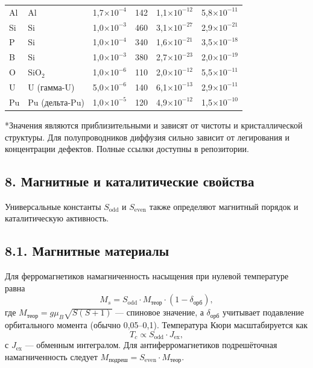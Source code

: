 \documentclass[12pt,a4paper]{article}
\begin{document}
\begin{longtable}{p{1.2cm}p{1.2cm}p{2.0cm}p{2.5cm}p{2.5cm}p{2.5cm}}
		Al & Al & 1,7\(\times10^{-4}\) & 142 & 1,1\(\times10^{-12}\) & 5,8\(\times10^{-11}\) \\
		Si & Si & 1,0\(\times10^{-3}\) & 460 & 3,1\(\times10^{-27}\) & 2,9\(\times10^{-21}\) \\
		P & Si & 1,0\(\times10^{-4}\) & 340 & 1,6\(\times10^{-21}\) & 3,5\(\times10^{-18}\) \\
		B & Si & 1,0\(\times10^{-3}\) & 380 & 2,7\(\times10^{-23}\) & 2,0\(\times10^{-19}\) \\
		O & SiO\(_2\) & 1,0\(\times10^{-6}\) & 110 & 2,0\(\times10^{-12}\) & 5,5\(\times10^{-11}\) \\
		U & U (гамма-U) & 5,0\(\times10^{-6}\) & 140 & 6,1\(\times10^{-13}\) & 2,9\(\times10^{-11}\) \\
		Pu & Pu (дельта-Pu) & 1,0\(\times10^{-5}\) & 120 & 4,9\(\times10^{-12}\) & 1,5\(\times10^{-10}\) \\
		\bottomrule
	\end{longtable}
	*Значения являются приблизительными и зависят от чистоты и кристаллической структуры. Для полупроводников диффузия сильно зависит от легирования и концентрации дефектов. Полные ссылки доступны в репозитории.
	
	
	
	\subsection*{8. Магнитные и каталитические свойства}
	
	Универсальные константы \(S_{\text{odd}}\) и \(S_{\text{even}}\) также определяют магнитный порядок и каталитическую активность.
	
	\subsection*{8.1. Магнитные материалы}
	Для ферромагнетиков намагниченность насыщения при нулевой температуре равна
	\[
	M_s = S_{\text{odd}} \cdot M_{\text{теор}} \cdot (1 - \delta_{\text{орб}}),
	\]
	где \(M_{\text{теор}} = g \mu_B \sqrt{S(S+1)}\) — спиновое значение, а \(\delta_{\text{орб}}\) учитывает подавление орбитального момента (обычно 0,05–0,1). Температура Кюри масштабируется как
	\[
	T_c \propto S_{\text{odd}} \cdot J_{\text{ex}},
	\]
	с \(J_{\text{ex}}\) — обменным интегралом. Для антиферромагнетиков подрешёточная намагниченность следует \(M_{\text{подреш}} = S_{\text{even}} \cdot M_{\text{теор}}\).
	
\end{document}
